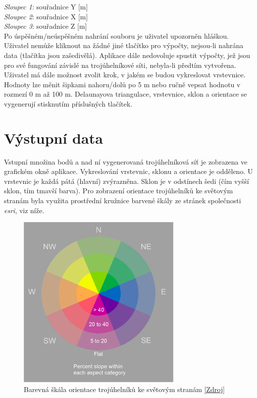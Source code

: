 \documentclass[a4paper, 12pt]{article}
\begin{document}
\textsl{Sloupec 1}: souřadnice Y [m]\\
\textsl{Sloupec 2}: souřadnice X [m]\\
\textsl{Sloupec 3}: souřadnice Z [m]\\

Po úspěšném/neúspěšném nahrání souboru je uživatel upozorněn hláškou. Uživatel nemůže kliknout na žádné jiné tlačítko pro výpočty, nejsou-li nahrána data (tlačítka jsou zašedivělá). Aplikace dále nedovoluje spustit výpočty, jež jsou pro své fungování závislé na trojúhelníkové síti, nebyla-li předtím vytvořena. Uživatel má dále možnost zvolit krok, v jakém se budou vykreslovat vrstevnice. Hodnoty lze měnit šipkami nahoru/dolů po 5 m nebo ručně vepsat hodnotu v rozmezí 0 m až 100 m. Delaunayova triangulace, vrstevnice, sklon a orientace se vygenerují stisknutím příslušných tlačítek.

\section{Výstupní data}
Vstupní množina bodů a nad ní vygenerovaná trojúhelníková síť je zobrazena ve grafickém okně aplikace. Vykreslování vrstevnic, sklonu a orientace je odděleno. U vrstevnic je každá pátá (hlavní) zvýrazněna. Sklon je v odstínech šedi (čím vyšší sklon, tím tmavší barva). Pro zobrazení orientace trojúhelníků ke světovým stranám byla využita prostřední kružnice barvené škály ze stránek společnosti \textit{esri}, viz níže.\\

\begin{figure}[h!]
	\centering
	\includegraphics[width=8cm]{./pictures/skala.png}
	\caption{Barevná škála orientace trojúhelníků ke světovým stranám \href{https://www.esri.com/arcgis-blog/products/arcgis-pro/imagery/new-aspect-slope-raster-function-now-available/?fbclid=IwAR0LX-HblA_iPSqg19aUKDW096LjaShp9r_ql8QwA_OJ26EkcFTpOEWJrlg}{[Zdroj]}}
\end{figure}
\end{document}
